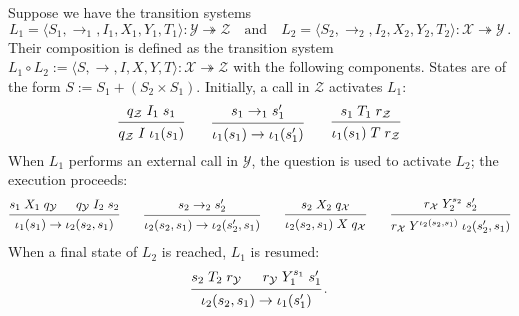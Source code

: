 \documentclass[acmsmall,review,anonymous]{acmart}\settopmatter{printfolios=true,printccs=false,printacmref=false}
\begin{document}
\begin{definition} %
Suppose we have the transition systems
\[
  L_1 = \langle S_1, {\rightarrow_1}, I_1, X_1, Y_1, T_1 \rangle
    : \mathcal{Y} \twoheadrightarrow \mathcal{Z}
  \quad \text{and} \quad
  L_2 = \langle S_2, {\rightarrow_2}, I_2, X_2, Y_2, T_2 \rangle
    : \mathcal{X} \twoheadrightarrow \mathcal{Y}
  \,.
\]
Their composition is defined as the transition system
$
  L_1 \circ L_2 :=
  \langle S, {\rightarrow}, I, X, Y, T \rangle
  : \mathcal{X} \twoheadrightarrow \mathcal{Z}
$
with the following components.
States are of the form
$
    S := S_1 + (S_2 \times S_1)
$.
Initially, a call in $\mathcal{Z}$ activates $L_1$:
\[
  \begin{prooftree}
    \hypo{q_\mathcal{Z} \mathrel{I_1} s_1}
    \infer1{q_\mathcal{Z} \mathrel{I} \iota_1(s_1)}
  \end{prooftree}
  \qquad
  \begin{prooftree}
    \hypo{s_1 \rightarrow_1 s_1'}
    \infer1{\iota_1(s_1) \rightarrow \iota_1(s_1')}
  \end{prooftree}
  \qquad
  \begin{prooftree}
    \hypo{s_1 \mathrel{T_1} r_\mathcal{Z}}
    \infer1{\iota_1(s_1) \mathrel{T} r_\mathcal{Z}}
  \end{prooftree}
\]
When $L_1$ performs an external call in $\mathcal{Y}$,
the question is used to activate $L_2$;
the execution proceeds:
\[
  \begin{prooftree}
    \hypo{s_1 \mathrel{X_1} q_\mathcal{Y}}
    \hypo{q_\mathcal{Y} \mathrel{I_2} s_2}
    \infer2{\iota_1(s_1) \rightarrow \iota_2(s_2, s_1)}
  \end{prooftree}
  \qquad
  \begin{prooftree}
    \hypo{s_2 \rightarrow_2 s_2'}
    \infer1{\iota_2(s_2, s_1) \rightarrow \iota_2(s_2', s_1)}
  \end{prooftree}
  \qquad
  \begin{prooftree}
    \hypo{s_2 \mathrel{X_2} q_\mathcal{X}}
    \infer1{\iota_2(s_2, s_1) \mathrel{X} q_\mathcal{X}}
  \end{prooftree}
  \qquad
  \begin{prooftree}
    \hypo{r_\mathcal{X} \mathrel{Y_2^{s_2}} s_2'}
    \infer1{r_\mathcal{X} \mathrel{Y^{\iota_2(s_2, s_1)}} \iota_2(s_2', s_1)}
  \end{prooftree}
\]
When a final state of $L_2$ is reached,
$L_1$ is resumed:
\[
  \begin{prooftree}
    \hypo{s_2 \mathrel{T_2} r_\mathcal{Y}}
    \hypo{r_\mathcal{Y} \mathrel{Y_1^{s_1}} s_1'}
    \infer2{\iota_2(s_2, s_1) \rightarrow \iota_1(s_1')}
  \end{prooftree}
  \,.
\]
\end{definition}
\end{document}
